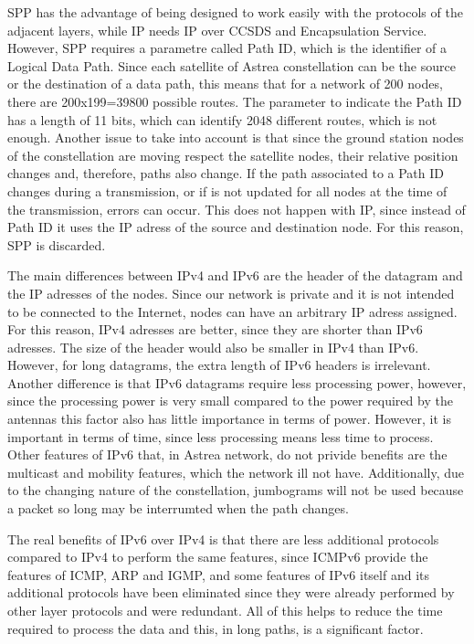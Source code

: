 SPP has the advantage of being designed to work easily with the protocols of the adjacent layers, while IP needs IP over CCSDS and Encapsulation Service. However, SPP requires a parametre called Path ID, which is the identifier of a Logical Data Path. Since each satellite of Astrea constellation can be the source or the destination of a data path, this means that for a network of 200 nodes, there are 200x199=39800 possible routes. The parameter to indicate the Path ID has a length of 11 bits, which can identify 2048 different routes, which is not enough. Another issue to take into account is that since the ground station nodes of the constellation are moving respect the satellite nodes, their relative position changes and, therefore, paths also change. If the path associated to a Path ID changes during a transmission, or if is not updated for all nodes at the time of the transmission, errors can occur. This does not happen with IP, since instead of Path ID it uses the IP adress of the source and destination node. For this reason, SPP is discarded.

The main differences between IPv4 and IPv6 are the header of the datagram and the IP adresses of the nodes. Since our  network is private and it is not intended to be connected to the Internet, nodes can have an arbitrary IP adress assigned. For this reason, IPv4 adresses are better, since they are shorter than IPv6 adresses. The size of the header would also be smaller in IPv4 than IPv6. However, for long datagrams, the extra length of IPv6 headers is irrelevant. Another difference is that IPv6 datagrams require less processing power, however, since the processing power is very small compared to the power required by the antennas this factor also has little importance in terms of power. However, it is important in terms of time, since less processing means less time to process. Other features of IPv6 that, in Astrea network, do not privide benefits are the multicast and mobility features, which the network ill not have. Additionally, due to the changing nature of the constellation, jumbograms will not be used because a packet so long may be interrumted when the path changes.

The real benefits of IPv6 over IPv4 is that there are less additional protocols compared to IPv4 to perform the same features, since ICMPv6 provide the features of ICMP, ARP and IGMP, and some features of IPv6 itself and its additional protocols have been eliminated since they were already performed by other layer protocols and were redundant. All of this helps to reduce the time required to process the data and this, in long paths, is a significant factor.

